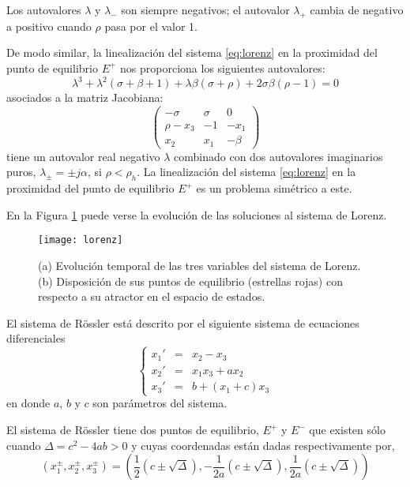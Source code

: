 Los autovalores  $\lambda$ y $\lambda_-$ son siempre negativos; el autovalor $\lambda_+$ cambia de negativo a positivo cuando $\rho$ pasa por el valor 1.

De modo similar, la linealización del sistema \ref{eq:lorenz} en la proximidad del punto de equilibrio $E^+$ nos proporciona los siguientes autovalores:
\begin{equation}
\lambda^3+\lambda^2(\sigma+\beta+1)+\lambda\beta(\sigma+\rho)+2\sigma\beta(\rho-1)=0 \nonumber
\end{equation}
asociados a la matriz Jacobiana:
\begin{equation}
\begin{pmatrix}
-\sigma &\sigma &0 \\
\rho-x_3 &-1 &-x_1 \\
x_2 &x_1 &-\beta
\end{pmatrix}
\nonumber
\end{equation}
tiene un autovalor real negativo $\lambda$ combinado con dos autovalores imaginarios puros, $\lambda_\pm = \pm j \alpha$, si $\rho < \rho_h$.
La linealización del sistema \ref{eq:lorenz} en la proximidad del punto de equilibrio $E^+$ es un problema simétrico a este.

En la Figura \ref{fig:lorenz} puede verse la evolución de las soluciones al sistema de Lorenz.
%
\begin{figure}
\centering\texttt{[image: lorenz]}
\caption{(a) Evolución temporal de las tres variables del sistema de Lorenz. (b) Disposición de sus puntos de equilibrio (estrellas rojas) con respecto a su atractor en el espacio de estados.}
\label{fig:lorenz}
\end{figure}

El sistema de Rössler está descrito por el siguiente sistema de ecuaciones diferenciales
\begin{equation}\label{eq:rossler}
\left \{
\begin{array}{rcl}
x_1' &=& x_2-x_3\\
x_2' &=& x_1x_3+ax_2\\
x_3' &=& b+(x_1+c)x_3
\end{array}
\right.
\end{equation}
en donde $a$, $b$ y $c$ son parámetros del sistema.

El sistema de Rössler tiene dos puntos de equilibrio, $E^+$ y $E^-$ que existen sólo cuando $\Delta = c^2-4ab > 0$ y cuyas coordenadas están dadas respectivamente por,
\begin{equation}
(x_1^\pm,x_2^\pm,x_3^\pm)=\left( \frac{1}{2} (c \pm \sqrt{\Delta}),-\frac{1}{2a} (c \pm \sqrt{\Delta}),\frac{1}{2a} (c \pm \sqrt{\Delta})\right) \nonumber
\end{equation}
 
